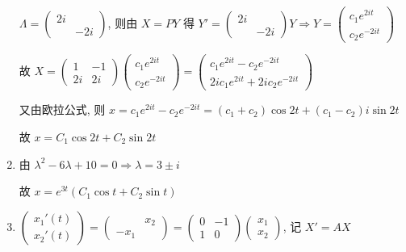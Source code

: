 \begin{enumerate}
                   \( \Lambda = \begin{pmatrix}
                       2i &     \\
                          & -2i
                   \end{pmatrix} \), 则由 \( X = P Y \) 得 \( Y' = \begin{pmatrix}
                       2i &     \\
                          & -2i
                   \end{pmatrix} Y \Rightarrow Y = \begin{pmatrix}
                       c_{1}e^{2it} \\
                       c_{2}e^{-2it}
                   \end{pmatrix} \)

                   故 \( X = \begin{pmatrix}
                       1  & -1 \\
                       2i & 2i
                   \end{pmatrix}\begin{pmatrix}
                       c_{1}e^{2it} \\
                       c_{2}e^{-2it}
                   \end{pmatrix} = \begin{pmatrix}
                       c_{1}e^{2it} - c_{2}e^{-2it} \\
                       2ic_{1}e^{2it} + 2ic_{2}e^{-2it}
                   \end{pmatrix} \)

                   又由欧拉公式, 则 \( x = c_{1}e^{2it} - c_{2}e^{-2it} = (c_{1}+c_{2})\cos 2t + (c_{1}-c_{2})i\sin 2t \)

                   故 \( x = C_{1}\cos 2t + C_{2}\sin 2t \)
             \item %
                   由 \( \lambda^{2} - 6\lambda + 10 = 0 \Rightarrow \lambda = 3 \pm i \)

                   故 \( x = e^{3t}(C_{1}\cos t + C_{2}\sin t) \)
             \item %
                   \( \begin{pmatrix}
                       x_{1}'(t) \\
                       x_{2}'(t)
                   \end{pmatrix} = \begin{pmatrix}
                              & x_{2} \\
                       -x_{1} &
                   \end{pmatrix} = \begin{pmatrix}
                       0 & -1 \\
                       1 & 0
                   \end{pmatrix}\begin{pmatrix}
                       x_{1} \\
                       x_{2}
                   \end{pmatrix} \), 记 \( X' = AX \)


\end{enumerate}

